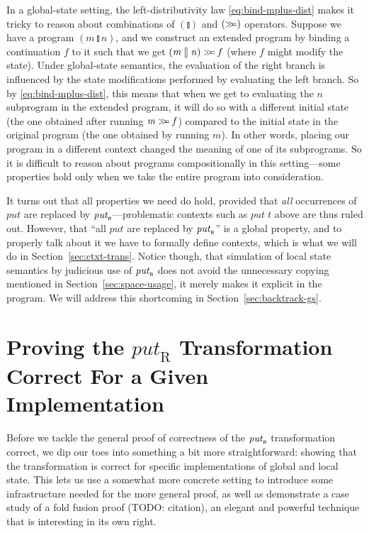 \documentclass{llncs}
\newcommand{\Varid}[1]{\mathit{#1}}
\let\Varid\mathit
\begin{document}
In a global-state setting, the left-distributivity law
\eqref{eq:bind-mplus-dist} makes it tricky to reason about combinations of
\ensuremath{(\talloblong)} and \ensuremath{(\mathrel{\hstretch{0.7}{>\!\!>\!\!=}})} operators. Suppose we have a program \ensuremath{(\Varid{m}\mathbin{\talloblong}\Varid{n})}, and we
construct an extended program by binding a continuation \ensuremath{\Varid{f}} to it such that we
get \ensuremath{(\Varid{m}\mathbin{\talloblong}\Varid{n})\mathrel{\hstretch{0.7}{>\!\!>\!\!=}}\Varid{f}} (where \ensuremath{\Varid{f}} might modify the state). Under global-state
semantics, the evaluation of the right branch is influenced by the state
modifications performed by evaluating the left branch. So by
\eqref{eq:bind-mplus-dist}, this means that when we get to evaluating the \ensuremath{\Varid{n}}
subprogram in the extended program, it will do so with a different initial state
(the one obtained after running \ensuremath{\Varid{m}\mathrel{\hstretch{0.7}{>\!\!>\!\!=}}\Varid{f}}) compared to the initial state in the
original program (the one obtained by running \ensuremath{\Varid{m}}). In other words, placing our
program in a different context changed the meaning of one of its subprograms. So
it is difficult to reason about programs compositionally in this
setting---some properties hold only when we take the entire program into
consideration.

It turns out that all properties we need do hold, provided that {\em all}
occurrences of \ensuremath{\Varid{put}} are replaced by \ensuremath{\Varid{put}_{\scaleobj{0.7}{\sf R}}}---problematic contexts such as
\ensuremath{\Varid{put}\;\Varid{t}} above are thus ruled out. However, that ``all \ensuremath{\Varid{put}} are replaced by
\ensuremath{\Varid{put}_{\scaleobj{0.7}{\sf R}}}'' is a global property, and to properly talk about it we have to formally
define contexts, which is what we will do in Section~\ref{sec:ctxt-trans}.
Notice though, that simulation of local state semantics by judicious use of
\ensuremath{\Varid{put}_{\scaleobj{0.7}{\sf R}}} does not avoid the unnecessary copying mentioned in
Section~\ref{sec:space-usage}, it merely makes it explicit in the program.
We will address this shortcoming in Section~\ref{sec:backtrack-gs}.
\section{Proving the $\mathit{put}_{\text{R}}$ Transformation Correct For a Given Implementation}
Before we tackle the general proof of correctness of the \ensuremath{\Varid{put}_{\scaleobj{0.7}{\sf R}}} transformation
correct, we dip our toes into something a bit more straightforward: showing that
the transformation is correct for specific implementations of global and local
state. This lets us use a somewhat more concrete setting to introduce some
infrastructure needed for the more general proof, as well as demonstrate a case
study of a fold fusion proof (TODO: citation), an elegant and powerful technique
that is interesting in its own right.
\end{document}
